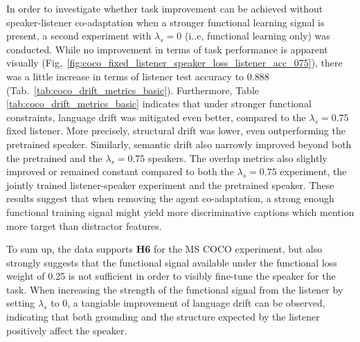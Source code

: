 In order to investigate whether task improvement can be achieved without speaker-listener co-adaptation when a stronger functional learning signal is present, a second experiment with $\lambda_s=0$ (i..e, functional learning only) was conducted. While no improvement in terms of task performance is apparent visually (Fig,~\ref{fig:coco_fixed_listener_speaker_loss_listener_acc_075}), there was a little increase in terms of listener test accuracy to 0.888 (Tab.~\ref{tab:coco_drift_metrics_basic}). Furthermore, Table \ref{tab:coco_drift_metrics_basic} indicates that under stronger functional constraints, language drift was mitigated even better, compared to the $\lambda_s = 0.75$ fixed listener. More precisely, structural drift was lower, even outperforming the pretrained speaker. Similarly, semantic drift also narrowly improved beyond both the pretrained and the $\lambda_s = 0.75$ speakers. 
The overlap metrics also slightly improved or remained constant compared to both the $\lambda_s=0.75$ experiment, the jointly trained listener-speaker experiment and the pretrained speaker. These results suggest that when removing the agent co-adaptation, a strong enough functional training signal might yield more discriminative captions which mention more target than distractor features. 

To sum up, the data supports \textbf{H6} for the MS COCO experiment, but also strongly suggests that the functional signal available under the functional loss weight of 0.25 is not sufficient in order to visibly fine-tune the speaker for the task. When increasing the strength of the functional signal from the listener by setting $\lambda_s$ to 0, a tangiable improvement of language drift can be observed, indicating that both grounding and the structure expected by the listener positively affect the speaker.

